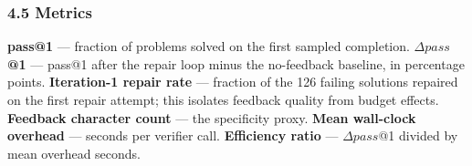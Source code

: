 \subsubsection{4.5 Metrics}

\textbf{pass@1} --- fraction of problems solved on the first sampled completion. \textbf{$\Delta pass$@1} --- pass@1 after the repair loop minus the no-feedback baseline, in percentage points. \textbf{Iteration-1 repair rate} --- fraction of the 126 failing solutions repaired on the first repair attempt; this isolates feedback quality from budget effects. \textbf{Feedback character count} --- the specificity proxy. \textbf{Mean wall-clock overhead} --- seconds per verifier call. \textbf{Efficiency ratio} --- $\Delta pass$@1 divided by mean overhead seconds.

